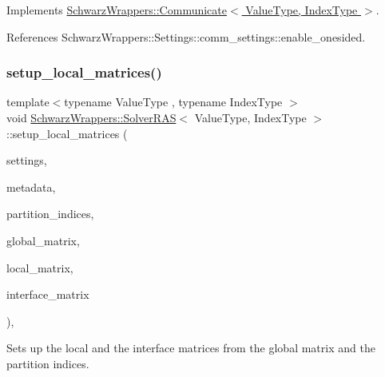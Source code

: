 Implements \hyperlink{classSchwarzWrappers_1_1Communicate_af6ef7b0a4d98427c8c0ea4f4244b08d1}{Schwarz\+Wrappers\+::\+Communicate$<$ Value\+Type, Index\+Type $>$}.



References Schwarz\+Wrappers\+::\+Settings\+::comm\+\_\+settings\+::enable\+\_\+onesided.

\mbox{\label{classSchwarzWrappers_1_1SolverRAS_a089d372b0b3d9829eb64f2394c035e8b}} 
\subsubsection{\texorpdfstring{setup\+\_\+local\+\_\+matrices()}{setup\_local\_matrices()}}
{\footnotesize\ttfamily template$<$typename Value\+Type , typename Index\+Type $>$ \\
void \hyperlink{classSchwarzWrappers_1_1SolverRAS}{Schwarz\+Wrappers\+::\+Solver\+R\+AS}$<$ Value\+Type, Index\+Type $>$\+::setup\+\_\+local\+\_\+matrices (\begin{DoxyParamCaption}\item[{\hyperlink{structSchwarzWrappers_1_1Settings}{Settings} \&}]{settings,  }\item[{\hyperlink{structSchwarzWrappers_1_1Metadata}{Metadata}$<$ Value\+Type, Index\+Type $>$ \&}]{metadata,  }\item[{std\+::vector$<$ unsigned int $>$ \&}]{partition\+\_\+indices,  }\item[{std\+::shared\+\_\+ptr$<$ gko\+::matrix\+::\+Csr$<$ Value\+Type, Index\+Type $>$$>$ \&}]{global\+\_\+matrix,  }\item[{std\+::shared\+\_\+ptr$<$ gko\+::matrix\+::\+Csr$<$ Value\+Type, Index\+Type $>$$>$ \&}]{local\+\_\+matrix,  }\item[{std\+::shared\+\_\+ptr$<$ gko\+::matrix\+::\+Csr$<$ Value\+Type, Index\+Type $>$$>$ \&}]{interface\+\_\+matrix }\end{DoxyParamCaption})\hspace{0.3cm}{\ttfamily [override]}, {\ttfamily [virtual]}}



Sets up the local and the interface matrices from the global matrix and the partition indices. 


